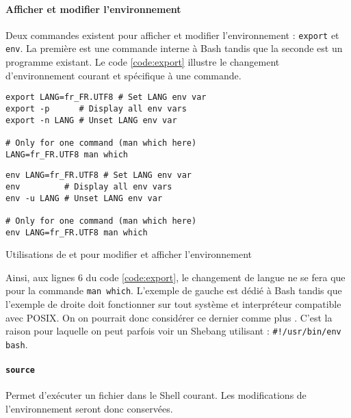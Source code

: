 \paragraph{Afficher et modifier l'environnement}
Deux commandes existent pour afficher et modifier l'environnement : \texttt{export} et \texttt{env}. La première est une commande interne à Bash tandis que la seconde est un programme existant. Le code \ref{code:export} illustre le changement d'environnement courant et spécifique à une commande.
\begin{code}
    \centering
    \noindent\begin{minipage}{.475\textwidth}
    \begin{verbatim}
export LANG=fr_FR.UTF8 # Set LANG env var
export -p      # Display all env vars
export -n LANG # Unset LANG env var

# Only for one command (man which here)
LANG=fr_FR.UTF8 man which
\end{verbatim}
\end{minipage}\hfill
\begin{minipage}{.475\textwidth}
\begin{verbatim}
env LANG=fr_FR.UTF8 # Set LANG env var
env         # Display all env vars
env -u LANG # Unset LANG env var

# Only for one command (man which here)
env LANG=fr_FR.UTF8 man which
\end{verbatim}
\end{minipage}\hfill
    \caption{Utilisations de  et  pour modifier et afficher l'environnement}
    \label{code:export}
\end{code}

Ainsi, aux lignes 6 du code \ref{code:export}, le changement de langue ne se fera que pour la commande \texttt{man which}. L'exemple de gauche est dédié à Bash tandis que l'exemple de droite doit fonctionner sur tout système et interpréteur compatible avec POSIX. On on pourrait donc considérer ce dernier comme plus . C'est la raison pour laquelle on peut parfois voir un Shebang utilisant  : \texttt{#!/usr/bin/env bash}.

\paragraph{\texttt{source}} 
Permet d'exécuter un fichier dans le Shell courant. Les modifications de l'environnement seront donc conservées. 

